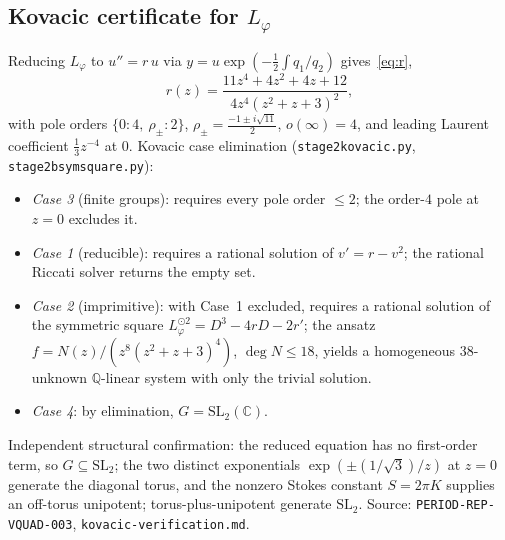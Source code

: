 \documentclass[11pt,reqno]{amsart}
\renewcommand{\_}{\vquadorigunderscore\allowbreak}
\theoremstyle{plain}
\theoremstyle{definition}
\newcommand{\Lphi}{L_{\varphi}}
\newcommand{\SL}{\mathrm{SL}}
\begin{document}
\subsection{Kovacic certificate for \texorpdfstring{$\Lphi$}{Lphi}}\label{app:kovacic}
Reducing $\Lphi$ to $u''=r\,u$ via $y=u\exp(-\tfrac12\int q_1/q_2)$ gives~\eqref{eq:r},
\[
  r(z)=\frac{11z^4+4z^2+4z+12}{4z^4(z^2+z+3)^2},
\]
with pole orders $\{0:4,\ \rho_\pm:2\}$, $\rho_\pm=\tfrac{-1\pm i\sqrt{11}}2$, $o(\infty)=4$, and
leading Laurent coefficient $\tfrac13 z^{-4}$ at $0$. Kovacic case elimination
(\texttt{stage2\_kovacic.py}, \texttt{stage2b\_symsquare.py}):
\begin{itemize}[leftmargin=1.4em,itemsep=1pt]
  \item \emph{Case 3} (finite groups): requires every pole order $\le2$; the order-$4$ pole at
        $z=0$ excludes it.
  \item \emph{Case 1} (reducible): requires a rational solution of $v'=r-v^2$; the rational
        Riccati solver returns the empty set.
  \item \emph{Case 2} (imprimitive): with Case~1 excluded, requires a rational solution of the
        symmetric square $\Lphi^{\odot2}=D^3-4rD-2r'$; the ansatz $f=N(z)/(z^8(z^2+z+3)^4)$,
        $\deg N\le18$, yields a homogeneous $38$-unknown $\mathbb{Q}$-linear system with only the
        trivial solution.
  \item \emph{Case 4}: by elimination, $G=\SL_2(\mathbb{C})$.
\end{itemize}
Independent structural confirmation: the reduced equation has no first-order term, so
$G\subseteq\SL_2$; the two distinct exponentials $\exp(\pm(1/\sqrt3)/z)$ at $z=0$ generate the
diagonal torus, and the nonzero Stokes constant $S=2\pi K$ supplies an off-torus unipotent;
torus-plus-unipotent generate $\SL_2$. Source: \texttt{PERIOD-REP-VQUAD-003},
\texttt{kovacic-verification.md}.
\end{document}
